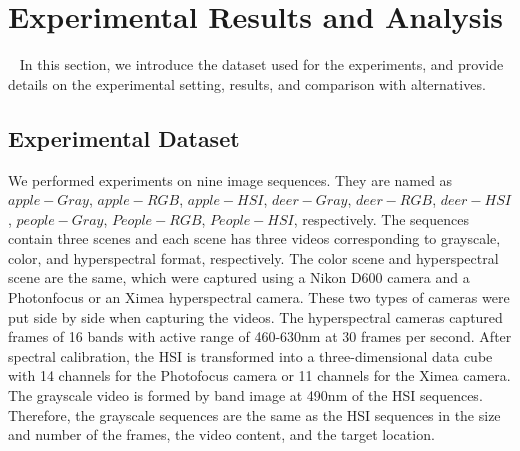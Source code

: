 \documentclass[runningheads,a4paper]{llncs}
\begin{document}
\section{Experimental Results and Analysis}~\label{sec:experiments}
In this section, we introduce the dataset used for the experiments, and provide details on the experimental setting, results, and comparison with alternatives.

\subsection{Experimental Dataset}
We performed experiments on nine image sequences. They are named as $apple-Gray$, $apple-RGB$, $apple-HSI$, $deer-Gray$, $deer-RGB$, $deer-HSI$, $people-Gray$, $People-RGB$, $People-HSI$, respectively. The sequences contain three scenes and each scene has three videos corresponding to grayscale, color, and hyperspectral format, respectively. The color scene and hyperspectral scene are the same, which were captured using a Nikon D600 camera and a Photonfocus or an Ximea hyperspectral camera. These two types of cameras were put side by side when capturing the videos. The hyperspectral cameras captured frames of 16 bands with active range of 460-630nm at 30 frames per second. After spectral calibration, the HSI is transformed into a three-dimensional data cube with 14 channels for the Photofocus camera or 11 channels for the Ximea camera. The grayscale video is formed by band image at 490nm of the HSI sequences. Therefore, the grayscale sequences are the same as the HSI sequences in the size and number of the frames, the video content, and the target location.

\begin{table}
\caption{Summary of video sequences.}\label{tab1}
\centering
{}
\end{table}
\end{document}
